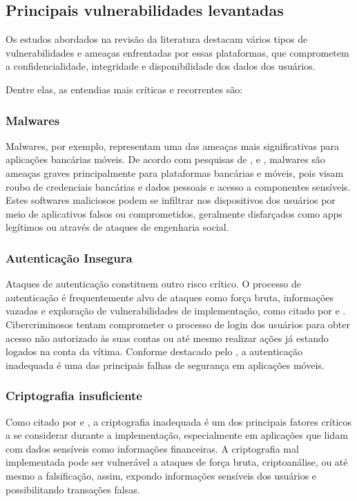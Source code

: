     \subsection{Principais vulnerabilidades levantadas}
    \label{ameaças}
    Os estudos abordados na revisão da literatura destacam vários tipos de vulnerabilidades e ameaças enfrentadas por essas plataformas, que comprometem a confidencialidade, integridade e disponibilidade dos dados dos usuários. 
    
    Dentre elas, as entendias mais críticas e recorrentes são:

    \subsubsection{Malwares}
    Malwares, por exemplo, representam uma das ameaças mais significativas para aplicações bancárias móveis. De acordo com pesquisas de ,  e , malwares são ameaças graves principalmente para plataformas bancárias e móveis, pois visam roubo de credenciais bancárias e dados pessoais e acesso a componentes sensíveis. Estes softwares maliciosos podem se infiltrar nos dispositivos dos usuários por meio de aplicativos falsos ou comprometidos, geralmente disfarçados como apps legítimos ou através de ataques de engenharia social.

    \subsubsection{Autenticação Insegura}
    Ataques de autenticação constituem outro risco crítico. O processo de autenticação é frequentemente alvo de ataques como força bruta, informações vazadas e exploração de vulnerabilidades de implementação, como citado por  e . Cibercriminosos tentam comprometer o processo de login dos usuários para obter acesso não autorizado às suas contas ou até mesmo realizar ações já estando logados na conta da vítima. Conforme destacado pelo , a autenticação inadequada é uma das principais falhas de segurança em aplicações móveis. 

    \subsubsection{Criptografia insuficiente}
    Como citado por  e , a criptografia inadequada é um dos principais fatores críticos a se considerar durante a implementação, especialmente em aplicações que lidam com dados sensíveis como informações financeiras. A criptografia mal implementada pode ser vulnerável a ataques de força bruta, criptoanálise, ou até mesmo a falsificação, assim, expondo informações sensíveis dos usuários e possibilitando transações falsas.

